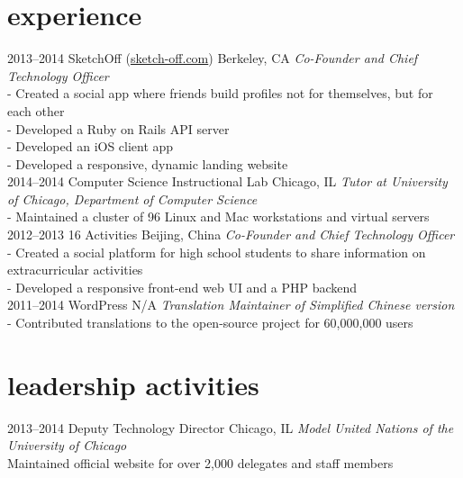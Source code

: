 \documentclass{friggeri-cv} %
\begin{document}
\section{experience}

\begin{entrylist}
\entry
{2013--2014}
{SketchOff \quad\normalfont (\underline{sketch-off.com})}
{Berkeley, CA}
{\emph{Co-Founder and Chief Technology Officer} \\
- Created a social app where friends build profiles not for themselves, but for each other \\
- Developed a Ruby on Rails API server \\
- Developed an iOS client app \\
- Developed a responsive, dynamic landing website \\}
\entry
{2014--2014}
{Computer Science Instructional Lab}
{Chicago, IL}
{\emph{Tutor at University of Chicago, Department of Computer Science} \\
- Maintained a cluster of 96 Linux and Mac workstations and virtual servers\\}
\entry
{2012--2013}
{16 Activities}
{Beijing, China}
{\emph{Co-Founder and Chief Technology Officer} \\
- Created a social platform for high school students to share information on extracurricular activities \\
- Developed a responsive front-end web UI and a PHP backend \\}
\entry
{2011--2014}
{WordPress}
{N/A}
{\emph{Translation Maintainer of Simplified Chinese version} \\
-   Contributed translations to the open-source project for 60,000,000 users \\}
\end{entrylist}

\section{leadership activities}

\begin{entrylist}
\entry
{2013--2014}
{Deputy Technology Director}
{Chicago, IL}
{\emph{Model United Nations of the University of Chicago} \\
Maintained official website for over 2,000 delegates and staff members \\}
\end{entrylist}
\end{document}
